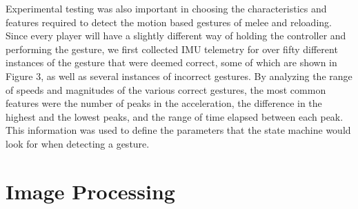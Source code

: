 \documentclass[titlepage, 12pt]{scrartcl}
\begin{document}
    Experimental testing was also important in choosing the characteristics and features required to detect the motion based gestures of melee and reloading. Since every player will have a slightly different way of holding the controller and performing the gesture, we first collected IMU telemetry for over fifty different instances of the gesture that were deemed correct, some of which are shown in Figure 3, as well as several instances of incorrect gestures. By analyzing the range of speeds and magnitudes of the various correct gestures, the most common features were the number of peaks in the acceleration, the difference in the highest and the lowest peaks, and the range of time elapsed between each peak. This information was used to define the parameters that the state machine would look for when detecting a gesture. \par
\section{Image Processing}
\end{document}
